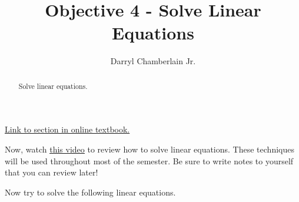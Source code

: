 \documentclass{ximera}
\author{Darryl Chamberlain Jr.}
\title{Objective 4 - Solve Linear Equations}
\begin{document}
\begin{abstract}
Solve linear equations. 
\end{abstract}
\maketitle

\href{https://cnx.org/contents/mwjClAV_@8.1:62_eXnY6@14/Linear-Equations-in-One-Variable}{Link to section in online textbook.}


Now, watch \underline{\href{https://mediasite.video.ufl.edu/Mediasite/Play/486c7ecd0ea14369bfc405492ae942f51d}{this video}} to review how to solve linear equations. These techniques will be used throughout most of the semester. Be sure to write notes to yourself that you can review later!

Now try to solve the following linear equations. 
\end{document}
